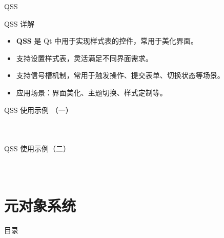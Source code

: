 \documentclass[UTF8,aspectratio=169]{beamer}
\begin{document}
\begin{frame}{QSS}
    \begin{ytublock}{QSS 详解}
        \begin{itemize}
            \item \textbf{QSS} 是 Qt 中用于实现样式表的控件，常用于美化界面。
            \item 支持设置样式表，灵活满足不同界面需求。
            \item 支持信号槽机制，常用于触发操作、提交表单、切换状态等场景。
            \item 应用场景：界面美化、主题切换、样式定制等。
        \end{itemize}
    \end{ytublock}
\end{frame}

\begin{frame}[fragile]{QSS 使用示例 （一）}
    \begin{columns}
        \begin{column}{0.48\textwidth}
            \inputminted[firstline=1,lastline=19]{cpp}{code/qt_qss_example.cpp}
        \end{column}
        \begin{column}{0.48\textwidth}
            \inputminted[firstline=20,lastline=39]{cpp}{code/qt_qss_example.cpp}
        \end{column}
    \end{columns}
\end{frame}

\begin{frame}[fragile]{QSS 使用示例（二）}
    \begin{columns}
        \begin{column}{0.48\textwidth}
            \inputminted[firstline=40,lastline=58]{cpp}{code/qt_qss_example.cpp}
        \end{column}
        \begin{column}{0.48\textwidth}
            \inputminted[firstline=59,lastline=78]{cpp}{code/qt_qss_example.cpp}
        \end{column}
    \end{columns}
\end{frame}

\section{元对象系统}
\begin{frame}{目录}
    \begin{multicols}{2}
        \tableofcontents[currentsection]
    \end{multicols}
\end{frame}
\end{document}
